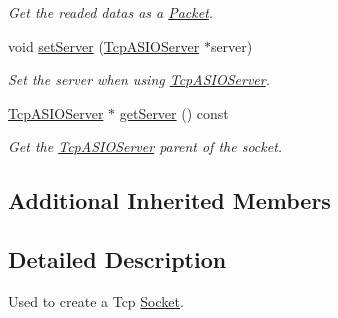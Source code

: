 \begin{DoxyCompactItemize}
\begin{DoxyCompactList}\small\item\em Get the readed datas as a \hyperlink{classmognetwork_1_1_packet}{Packet}. \end{DoxyCompactList}\item 
void \hyperlink{classmognetwork_1_1_tcp_socket_ae35e2fd8fbf6f9d3bdb87650b3bedff1}{set\-Server} (\hyperlink{classmognetwork_1_1_tcp_a_s_i_o_server}{Tcp\-A\-S\-I\-O\-Server} $\ast$server)
\begin{DoxyCompactList}\small\item\em Set the server when using \hyperlink{classmognetwork_1_1_tcp_a_s_i_o_server}{Tcp\-A\-S\-I\-O\-Server}. \end{DoxyCompactList}\item 
\hyperlink{classmognetwork_1_1_tcp_a_s_i_o_server}{Tcp\-A\-S\-I\-O\-Server} $\ast$ \hyperlink{classmognetwork_1_1_tcp_socket_ab07f10a9f78168c051e7429e7f45a95f}{get\-Server} () const 
\begin{DoxyCompactList}\small\item\em Get the \hyperlink{classmognetwork_1_1_tcp_a_s_i_o_server}{Tcp\-A\-S\-I\-O\-Server} parent of the socket. \end{DoxyCompactList}\end{DoxyCompactItemize}
\subsection*{Additional Inherited Members}


\subsection{Detailed Description}
Used to create a Tcp \hyperlink{classmognetwork_1_1_socket}{Socket}. 


